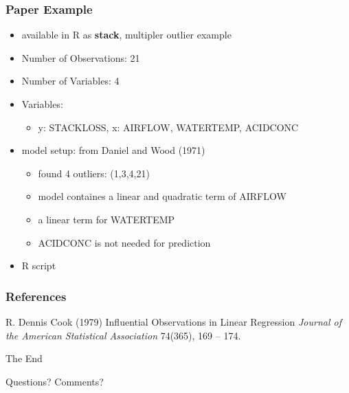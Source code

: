 \documentclass[
	11pt, %
]{beamer}
\begin{document}
\begin{frame}
	\frametitle{Paper Example}
	\begin{itemize}
		\item available in R as \textbf{stack}, multipler outlier example
		\item Number of Observations: 21
		\item Number of Variables: 4
		\item Variables:
		\begin{itemize}
			\item y: STACKLOSS, x: AIRFLOW, WATERTEMP, ACIDCONC
		\end{itemize}
		\item model setup: from Daniel and Wood (1971) 
		\begin{itemize}
			\item found 4 outliers: (1,3,4,21)
			\item model containes a linear and quadratic term of AIRFLOW
			\item a linear term for WATERTEMP
			\item ACIDCONC is not needed for prediction
		\end{itemize}
		\item R script
	\end{itemize}	
\end{frame}

\begin{frame} %
	\frametitle{References}
	
	\begin{thebibliography}{99} %
		\footnotesize %
			R. Dennis Cook (1979)
			\newblock Influential Observations in Linear Regression
			\newblock \emph{Journal of the American Statistical Association} 74(365), 169 -- 174.
	\end{thebibliography}
\end{frame}

\begin{frame}[plain] %
	\begin{center}
		{\Huge The End}
		
		\bigskip\bigskip %
		
		{\LARGE Questions? Comments?}
	\end{center}
\end{frame}
\end{document}
